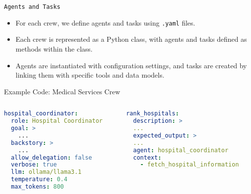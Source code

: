 \begin{frame}[fragile]{\texttt{Agents and Tasks}}
    \begin{itemize}
        \item For each crew, we define agents and tasks using \texttt{.yaml} files.
        \item Each crew is represented as a Python class, with agents and tasks defined as methods within the class.
        \item Agents are instantiated with configuration settings, and tasks are created by linking them with specific tools and data models.
    \end{itemize}
    \Large \color{red}Example Code: Medical Services Crew \color{black}
      \begin{columns}
        \begin{column}{0.48\textwidth} %
            \centering
            \begin{lstlisting}[language=yaml, breaklines=true]
hospital_coordinator:
  role: Hospital Coordinator
  goal: >
    ...
  backstory: >
    ...
  allow_delegation: false
  verbose: true
  llm: ollama/llama3.1
  temperature: 0.4
  max_tokens: 800

            \end{lstlisting}
        \end{column}
        \begin{column}{0.48\textwidth} %
            \centering
            \begin{lstlisting}[language=yaml, breaklines=true]
rank_hospitals:
  description: >
  ...
  expected_output: >
  ...
  agent: hospital_coordinator
  context:
    - fetch_hospital_information
            \end{lstlisting}
        \end{column}
      \end{columns}
\end{frame}